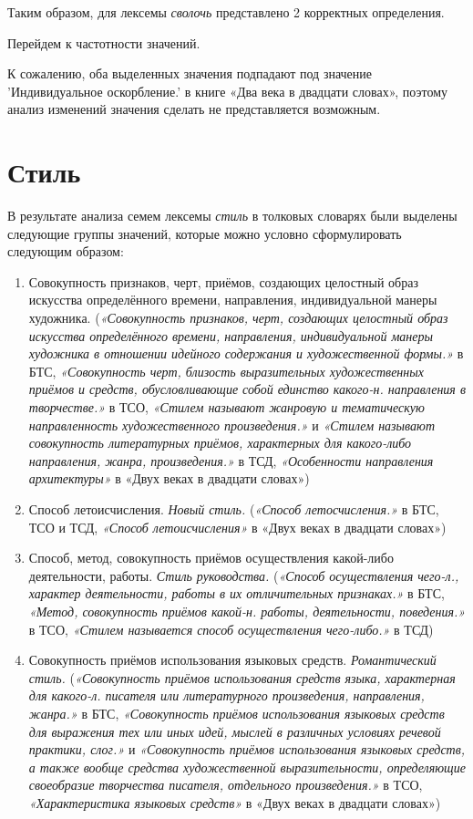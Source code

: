 Таким образом, для лексемы \textit{сволочь} представлено 2 корректных определения.

Перейдем к частотности значений.

К сожалению, оба выделенных значения подпадают под значение ’Индивидуальное оскорбление.’
в книге «Два века в двадцати словах», поэтому анализ изменений значения
сделать не представляется возможным.

\section*{Стиль}

В результате анализа семем лексемы \textit{стиль} в толковых словарях были выделены следующие группы значений,
которые можно условно сформулировать следующим образом:

\begin{enumerate}
    \item Совокупность признаков, черт, приёмов, создающих целостный образ искусства определённого времени, направления, индивидуальной манеры художника.
(\textit{«Совокупность признаков, черт, создающих целостный образ искусства определённого времени, направления, индивидуальной манеры художника в отношении идейного содержания и художественной формы.»} в БТС,
\textit{«Совокупность черт, близость выразительных художественных приёмов и средств, обусловливающие собой единство какого-н. направления в творчестве.»} в ТСО,
\textit{«Стилем называют жанровую и тематическую направленность художественного произведения.»} и \textit{«Стилем называют совокупность литературных приёмов, характерных для какого-либо направления, жанра, произведения.»} в ТСД,
\textit{«Особенности направления архитектуры»} в «Двух веках в двадцати словах»)

    \item Способ летоисчисления. \textit{Новый стиль.}
(\textit{«Способ летосчисления.»} в БТС, ТСО и ТСД,
\textit{«Способ летоисчисления»} в «Двух веках в двадцати словах»)

    \item Способ, метод, совокупность приёмов осуществления какой-либо деятельности, работы. \textit{Стиль руководства.}
(\textit{«Способ осуществления чего-л., характер деятельности, работы в их отличительных признаках.»} в БТС,
\textit{«Метод, совокупность приёмов какой-н. работы, деятельности, поведения.»} в ТСО,
\textit{«Стилем называется способ осуществления чего-либо.»} в ТСД)

    \item Совокупность приёмов использования языковых средств. \textit{Романтический стиль.}
(\textit{«Совокупность приёмов использования средств языка, характерная для какого-л. писателя или литературного произведения, направления, жанра.»} в БТС,
\textit{«Совокупность приёмов использования языковых средств для выражения тех или иных идей, мыслей в различных условиях речевой практики, слог.»} и \textit{«Совокупность приёмов использования языковых средств, а также вообще средства художественной выразительности, определяющие своеобразие творчества писателя, отдельного произведения.»} в ТСО,
\textit{«Характеристика языковых средств»} в «Двух веках в двадцати словах»)


\end{enumerate}
